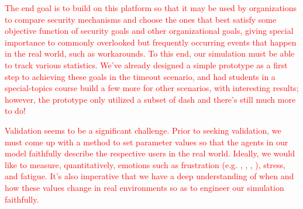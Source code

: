 \documentclass{acm_proc_article-sp}
\begin{document}
\textcolor{red}{The end goal is to build on this platform so that it may be 
used by organizations to compare security mechanisms and choose the 
ones that best satisfy some objective function of security goals 
and other organizational goals, giving special importance to commonly 
overlooked but frequently occurring events that happen in the real world, 
such as workarounds. To this end, our simulation must be able to 
track various statistics. We've already designed a simple prototype as a first 
step to achieving these goals in the timeout scenario, and had students in 
a special-topics course build a few more for other scenarios, with
interesting results; however, the prototype only utilized a subset of {\sc dash} 
and there's still much more to do!}

 \textcolor{red}{Validation seems to be a significant challenge. Prior to 
 seeking validation, we must come up with a method to 
set parameter values so that the agents in our model faithfully describe 
the respective users in the real world. Ideally, we would like to measure, 
quantitatively, emotions such as frustration (e.g. \cite{hazlett2003measurement}, \cite{kapoor2007automatic}, \cite{klein2002computer}, \cite{reynolds2001sensing}), stress, and fatigue. It's also 
imperative that we have a deep understanding of when and how these values 
change in real environments so as to engineer our simulation faithfully.}



\end{document}
